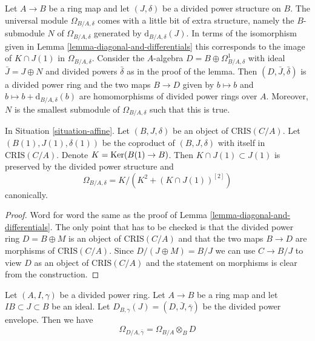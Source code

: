 \begin{remark}
\label{remark-filtration-differentials}
Let $A \to B$ be a ring map and let $(J, \delta)$ be a divided
power structure on $B$. The universal module $\Omega_{B/A, \delta}$
comes with a little bit of extra structure, namely the $B$-submodule
$N$ of $\Omega_{B/A, \delta}$ generated by $\text{d}_{B/A, \delta}(J)$.
In terms of the isomorphism given in
Lemma \ref{lemma-diagonal-and-differentials}
this corresponds to the image of
$K \cap J(1)$ in $\Omega_{B/A, \delta}$. Consider the $A$-algebra
$D = B \oplus \Omega^1_{B/A, \delta}$ with ideal $\bar J = J \oplus N$
and divided powers $\bar \delta$ as in the proof of the lemma.
Then $(D, \bar J, \bar \delta)$ is a divided power ring
and the two maps $B \to D$ given by $b \mapsto b$ and
$b \mapsto b + \text{d}_{B/A, \delta}(b)$
are homomorphisms of divided power rings over $A$. Moreover, $N$
is the smallest submodule of $\Omega_{B/A, \delta}$ such that this is true.
\end{remark}

\begin{lemma}
\label{lemma-diagonal-and-differentials-affine-site}
In Situation \ref{situation-affine}.
Let $(B, J, \delta)$ be an object of $\text{CRIS}(C/A)$.
Let $(B(1), J(1), \delta(1))$ be the coproduct of $(B, J, \delta)$
with itself in $\text{CRIS}(C/A)$. Denote
$K = \mathop{\mathrm{Ker}}(B(1) \to B)$. Then $K \cap J(1) \subset J(1)$
is preserved by the divided power structure and
$$
\Omega_{B/A, \delta} = K/ \left(K^2 + (K \cap J(1))^{[2]}\right)
$$
canonically.
\end{lemma}

\begin{proof}
Word for word the same as the proof of
Lemma \ref{lemma-diagonal-and-differentials}.
The only point that has to be checked is that the
divided power ring $D = B \oplus M$ is an object of $\text{CRIS}(C/A)$
and that the two maps $B \to D$ are morphisms of $\text{CRIS}(C/A)$.
Since $D/(J \oplus M) = B/J$ we can use $C \to B/J$ to view
$D$ as an object of $\text{CRIS}(C/A)$
and the statement on morphisms is clear from the construction.
\end{proof}

\begin{lemma}
\label{lemma-module-differentials-divided-power-envelope}
Let $(A, I, \gamma)$ be a divided power ring. Let $A \to B$ be a ring
map and let $IB \subset J \subset B$ be an ideal. Let
$D_{B, \gamma}(J) = (D, \bar J, \bar \gamma)$ be the divided power envelope.
Then we have
$$
\Omega_{D/A, \bar\gamma} = \Omega_{B/A} \otimes_B D
$$
\end{lemma}

